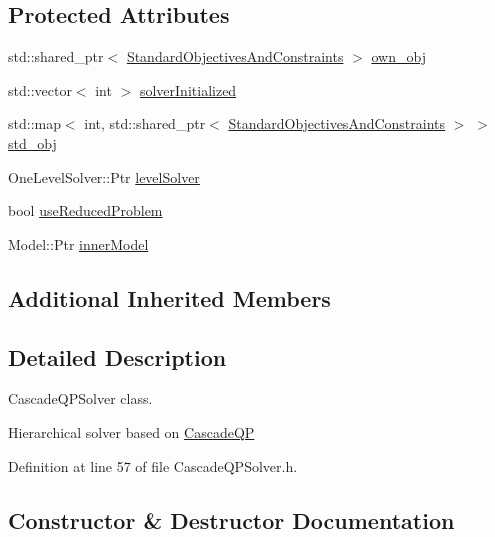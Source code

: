 \subsection*{Protected Attributes}
\begin{DoxyCompactItemize}
\item 
std\+::shared\+\_\+ptr$<$ \hyperlink{structocra_1_1CascadeQPSolver_1_1StandardObjectivesAndConstraints}{Standard\+Objectives\+And\+Constraints} $>$ \hyperlink{classocra_1_1CascadeQPSolver_aec6bf15caf1f29d7e1ec5aab696b1e7b}{own\+\_\+obj}
\item 
std\+::vector$<$ int $>$ \hyperlink{classocra_1_1CascadeQPSolver_a9d45b623d0012aae018b8eb8d4a66646}{solver\+Initialized}
\item 
std\+::map$<$ int, std\+::shared\+\_\+ptr$<$ \hyperlink{structocra_1_1CascadeQPSolver_1_1StandardObjectivesAndConstraints}{Standard\+Objectives\+And\+Constraints} $>$ $>$ \hyperlink{classocra_1_1CascadeQPSolver_aafe2d2d5226c421fc53880570a25a665}{std\+\_\+obj}
\item 
One\+Level\+Solver\+::\+Ptr \hyperlink{classocra_1_1CascadeQPSolver_a119ac44ca89426cddf6484577962726d}{level\+Solver}
\item 
bool \hyperlink{classocra_1_1CascadeQPSolver_a8703a516e8ce6adb088867d8b39dfa4d}{use\+Reduced\+Problem}
\item 
Model\+::\+Ptr \hyperlink{classocra_1_1CascadeQPSolver_a3a7c69b86a236e8b0ffc678be798109f}{inner\+Model}
\end{DoxyCompactItemize}
\subsection*{Additional Inherited Members}


\subsection{Detailed Description}
Cascade\+Q\+P\+Solver class. 

Hierarchical solver based on \hyperlink{classocra_1_1CascadeQP}{Cascade\+QP} 

Definition at line 57 of file Cascade\+Q\+P\+Solver.\+h.



\subsection{Constructor \& Destructor Documentation}
\hypertarget{classocra_1_1CascadeQPSolver_a85f1b7a863230a61f0bc3ce9ab93a908}{}\label{classocra_1_1CascadeQPSolver_a85f1b7a863230a61f0bc3ce9ab93a908} 
